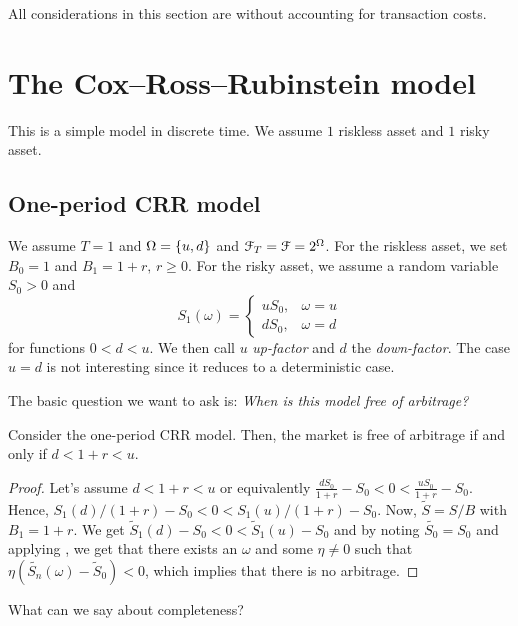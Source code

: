\documentclass[12pt]{amsart}
\begin{document}
\begin{remark}
    All considerations in this section are without accounting for transaction costs.
\end{remark}

\section{The Cox--Ross--Rubinstein model}

This is a simple model in discrete time. We assume \(1\) riskless asset and \(1\) risky asset.

\subsection{One-period CRR model}

We assume \(T=1\) and \(\Omega=\left\{ u, d \right\}\) and \(\mathcal{F}_T = \mathcal{F} = 2^\Omega\). For the riskless asset, we set \(B_0=1\) and \(B_1 = 1+r,\, r \geq 0\). For the risky asset, we assume a random variable \(S_0 > 0\) and \[
    S_1(\omega) = \begin{cases}
        uS_0, &\omega=u\\
        dS_0, &\omega=d
    \end{cases}
\]
for functions \(0 < d < u\). We then call \(u\) \emph{up-factor} and \(d\) the \emph{down-factor}. The case \(u=d\) is not interesting since it reduces to a deterministic case.

The basic question we want to ask is: \emph{When is this model free of arbitrage?}

\begin{theorem}\label{th:CRR_NA}
    Consider the one-period CRR model. Then, the market is free of arbitrage if and only if \(d < 1 + r < u\).
\end{theorem}
\begin{proof}
    Let's assume \(d < 1+r < u\) or equivalently \(\frac{dS_0}{1+r} - S_0 < 0 < \frac{u S_0}{1+r} - S_0\). Hence, \(S_1(d)/(1+r)-S_0 < 0 < S_1(u)/(1+r)-S_0\). Now, \(\tilde{S} = S/B\) with \(B_1 = 1+r\). We get \(\tilde{S}_1(d) - S_0 < 0 < \tilde{S}_1(u) - S_0\) and by noting \(\tilde{S_0} = S_0\) and applying , we get that there exists an \(\omega\) and some \(\eta \neq 0\) such that \(\eta(\tilde{S_n}(\omega) - \tilde{S}_0) < 0\), which implies that there is no arbitrage.
\end{proof}

What can we say about completeness?
\end{document}
